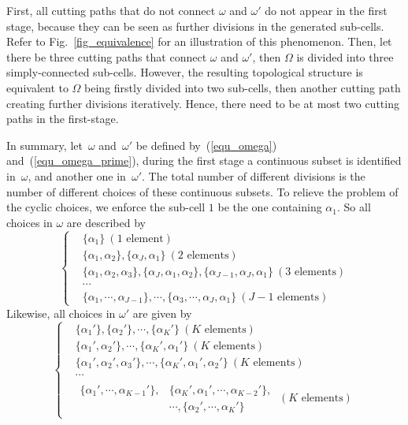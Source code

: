\documentclass[Afour,sageh,times]{sagej}
\begin{document}
First, all cutting paths that do not connect $\omega$ and $\omega'$ do not appear in the first stage, because they can be seen as further divisions in the generated sub-cells. Refer to Fig.~\ref{fig_equivalence} for an illustration of this phenomenon. 
Then, let there be three cutting paths that connect $\omega$ and $\omega'$, then $\Omega$ is divided into three simply-connected sub-cells. However, the resulting topological structure is equivalent to $\Omega$ being firstly divided into two sub-cells, then another cutting path creating further divisions iteratively. Hence, there need to be at most two cutting paths in the first-stage.  

In summary, let~$\omega$ and~$\omega'$ be defined by~(\ref{equ_omega}) and~(\ref{equ_omega_prime}), during the first stage a continuous 
subset is identified in~$\omega$, and another one in~$\omega'$. The total number of different divisions is the number of different choices of these continuous subsets. To relieve the problem of the cyclic choices, we enforce the sub-cell $1$ be the one containing $\alpha_1$. 
So all choices in $\omega$ are described by
\begin{equation}\label{equ_all_omega}
\left\{
\begin{aligned}
&\{\alpha_1\}\ (1\mbox{ element})\\
&\{\alpha_1, \alpha_2\}, \{\alpha_J, \alpha_1\}\ (2\mbox{ elements})\\
&\{\alpha_1, \alpha_2, \alpha_3\}, \{\alpha_J, \alpha_1, \alpha_2\}, \{\alpha_{J-1}, \alpha_J, \alpha_1\}\ (3\mbox{ elements})\\
&\cdots\\
&\{\alpha_1, \cdots, \alpha_{J-1}\}, \cdots, \{\alpha_3, \cdots, \alpha_J, \alpha_1\}\ (J-1\mbox{ elements})
\end{aligned}
\right.
\end{equation}
Likewise, all choices in $\omega'$ are given by
\begin{equation}\label{equ_all_omega_prime}
\left\{
\begin{aligned}
&\{\alpha_1'\}, \{\alpha_2'\}, \cdots, \{\alpha_K'\}\ (K\mbox{ elements})\\
&\{\alpha_1', \alpha_2'\}, \cdots, \{\alpha_K', \alpha_1'\}\ (K\mbox{ elements})\\
&\{\alpha_1', \alpha_2', \alpha_3'\}, \cdots, \{\alpha_{K}', \alpha_1', \alpha_2'\}\ (K\mbox{ elements})\\
&\cdots\\
&\begin{aligned}
 \{\alpha_1', \cdots, \alpha_{K-1}'\}, &\{\alpha_K', \alpha_1', \cdots, \alpha_{K-2}'\},\\
 &\cdots, \{\alpha_2', \cdots, \alpha_K'\}
\end{aligned}
\ (K\mbox{ elements})
\end{aligned}
\right.
\end{equation}
\end{document}
